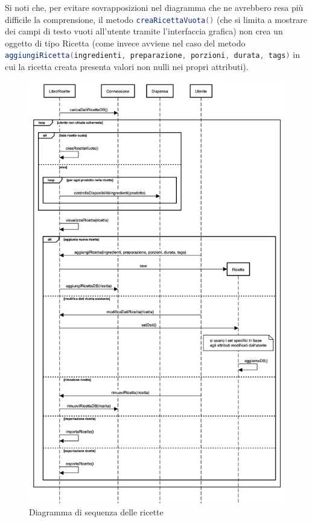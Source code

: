 \documentclass{article}
\newcommand{\inlinecode}[2]{{\lstinline[language=#1]$#2$}}
\begin{document}
Si noti che, per evitare sovrapposizioni nel diagramma che ne avrebbero resa più difficile la comprensione, il metodo \inlinecode{Java}{creaRicettaVuota()} (che si limita a mostrare dei campi di testo vuoti all'utente tramite l'interfaccia grafica) non crea un oggetto di tipo Ricetta (come invece avviene nel caso del metodo \\ \inlinecode{Java}{aggiungiRicetta(ingredienti, preparazione, porzioni, durata, tags)} in cui la ricetta creata presenta valori non nulli nei propri attributi).

\begin{figure}[H]
    \includegraphics[width=\linewidth]{images/sequence-recipe.png}
    \caption{Diagramma di sequenza delle ricette}
    \label{fig:seqrecipe}
\end{figure}
\end{document}
